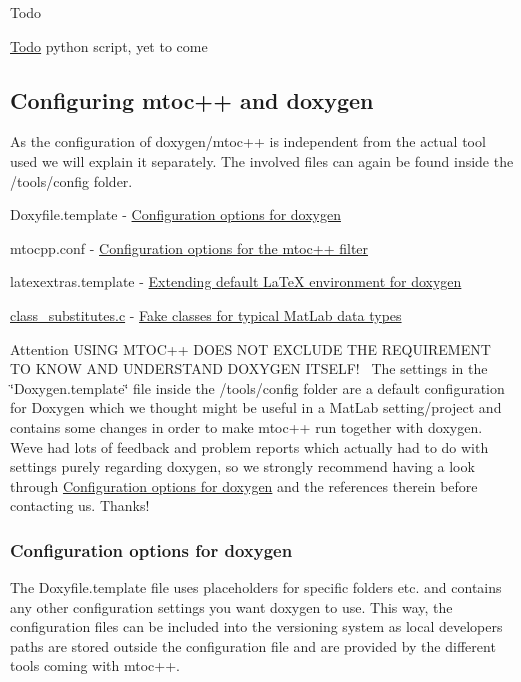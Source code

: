 \begin{DoxyRefDesc}{Todo}
\item[\hyperlink{todo__todo000002}{Todo}]python script, yet to come\end{DoxyRefDesc}
\hypertarget{tools_tools_config}{}\subsection{Configuring mtoc++ and doxygen}\label{tools_tools_config}
As the configuration of doxygen/mtoc++ is independent from the actual tool used we will explain it separately. The involved files can again be found inside the {\ttfamily /tools/config} folder.
\begin{DoxyItemize}
\item {\ttfamily Doxyfile.\+template} -\/ \hyperlink{tools_config_doxy}{Configuration options for doxygen}
\item {\ttfamily mtocpp.\+conf} -\/ \hyperlink{tools_config_mtocpp}{Configuration options for the mtoc++ filter}
\item {\ttfamily latexextras.\+template} -\/ \hyperlink{tools_config_latex}{Extending default La\+Te\+X environment for doxygen}
\item {\ttfamily \hyperlink{class__substitutes_8c_source}{class\+\_\+substitutes.\+c}} -\/ \hyperlink{tools_config_fakeclasses}{Fake classes for typical Mat\+Lab data types}
\end{DoxyItemize}

\begin{DoxyAttention}{Attention}
U\+S\+I\+N\+G M\+T\+O\+C++ D\+O\+E\+S N\+O\+T E\+X\+C\+L\+U\+D\+E T\+H\+E R\+E\+Q\+U\+I\+R\+E\+M\+E\+N\+T T\+O K\+N\+O\+W A\+N\+D U\+N\+D\+E\+R\+S\+T\+A\+N\+D D\+O\+X\+Y\+G\+E\+N I\+T\+S\+E\+L\+F!~\newline
 The settings in the \char`\"{}\+Doxygen.\+template\char`\"{} file inside the {\ttfamily /tools/config} folder are a default configuration for Doxygen which we thought might be useful in a Mat\+Lab setting/project and contains some changes in order to make mtoc++ run together with doxygen. We\textquotesingle{}ve had lots of feedback and problem reports which actually had to do with settings purely regarding doxygen, so we strongly recommend having a look through \hyperlink{tools_config_doxy}{Configuration options for doxygen} and the references therein before contacting us. Thanks!
\end{DoxyAttention}
\hypertarget{tools_config_doxy}{}\subsubsection{Configuration options for doxygen}\label{tools_config_doxy}
The {\ttfamily Doxyfile.\+template} file uses placeholders for specific folders etc. and contains any other configuration settings you want doxygen to use. This way, the configuration files can be included into the versioning system as local developers paths are stored outside the configuration file and are provided by the different tools coming with mtoc++.

